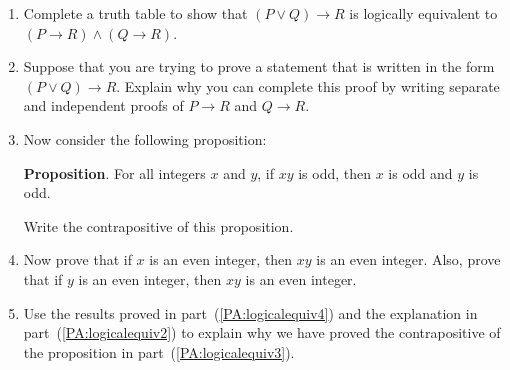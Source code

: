 \begin{previewactivity}\label{PA:logicalequiv} \hfill
\begin{enumerate}
\item Complete a truth table to show that  $\left( {P \vee Q} \right) \to R$
  is logically equivalent to  $\left( {P \to R} \right) \wedge \left( {Q \to R} \right)$.

\item Suppose that you are trying to prove a statement that is written in the form  
$\left( {P \vee Q} \right) \to R$.  Explain why you can complete this proof by writing separate and independent proofs of   $P \to R$ and   $Q \to R$. \label{PA:logicalequiv2}

\item Now consider the following proposition:

\noindent
\textbf{Proposition}.  For all integers $x$ and $y$, if $xy$ is odd, then $x$ is odd and $y$ is odd. \label{PA:logicalequiv3}

\noindent
Write the contrapositive of this proposition.

\item Now prove that if $x$ is an even integer, then $xy$ is an even integer.  Also, prove that if $y$ is an even integer, then $xy$ is an even integer. \label{PA:logicalequiv4}

\item Use the results proved in part~(\ref{PA:logicalequiv4}) and the explanation in part~(\ref{PA:logicalequiv2}) to explain why we have proved the contrapositive of the proposition in part~(\ref{PA:logicalequiv3}).
\end{enumerate}
\end{previewactivity}
\hbreak

\endinput

